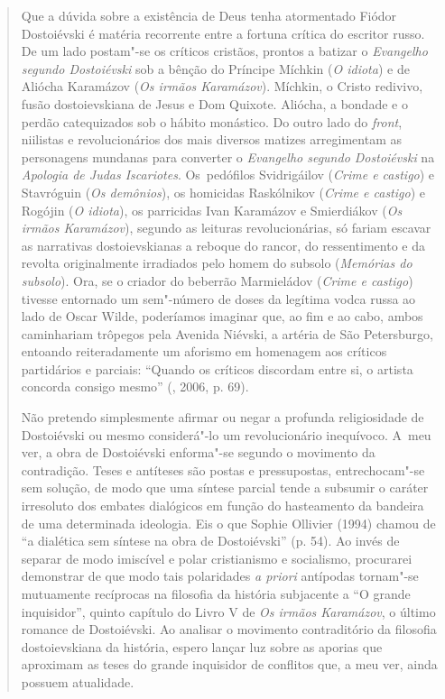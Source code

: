 {\begin{quote}
Que a dúvida sobre a existência de Deus tenha atormentado Fiódor
Dostoiévski é matéria recorrente entre a fortuna crítica do escritor
russo. De um lado postam"-se os críticos cristãos, prontos a batizar o
\emph{Evangelho segundo Dostoiévski} sob a bênção do Príncipe Míchkin
(\emph{O idiota}) e de Aliócha Karamázov (\emph{Os irmãos Karamázov}).
Míchkin, o Cristo redivivo, fusão dostoievskiana de Jesus e Dom Quixote.
Aliócha, a bondade e o perdão catequizados sob o hábito monástico. Do
outro lado do \emph{front}, niilistas e revolucionários dos mais
diversos matizes arregimentam as personagens mundanas para converter o
\emph{Evangelho segundo Dostoiévski} na \emph{Apologia de Judas
Iscariotes}. Os~pedófilos Svidrigáilov (\emph{Crime e castigo}) e
Stavróguin (\emph{Os demônios}), os homicidas Raskólnikov (\emph{Crime e
castigo}) e Rogójin (\emph{O idiota}), os parricidas Ivan Karamázov e
Smierdiákov (\emph{Os irmãos Karamázov}), segundo as leituras
revolucionárias, só fariam escavar as narrativas dostoievskianas a
reboque do rancor, do ressentimento e da revolta originalmente
irradiados pelo homem do subsolo (\emph{Memórias do subsolo}). Ora, se o
criador do beberrão Marmieládov (\emph{Crime e castigo}) tivesse
entornado um sem"-número de doses da legítima vodca russa ao lado de
Oscar Wilde, poderíamos imaginar que, ao fim e ao cabo, ambos
caminhariam trôpegos pela Avenida Niévski, a artéria de São Petersburgo,
entoando reiteradamente um aforismo em homenagem aos críticos
partidários e parciais: ``Quando os críticos discordam entre si, o
artista concorda consigo mesmo'' (, 2006, p. 69).

Não pretendo simplesmente afirmar ou negar a profunda religiosidade de
Dostoiévski ou mesmo considerá"-lo um revolucionário inequívoco. A~meu
ver, a obra de Dostoiévski enforma"-se segundo o movimento da
contradição. Teses e antíteses são postas e pressupostas, entrechocam"-se
sem solução, de modo que uma síntese parcial tende a subsumir o caráter
irresoluto dos embates dialógicos em função do hasteamento da bandeira
de uma determinada ideologia. Eis o que Sophie Ollivier (1994) chamou de
``a dialética sem síntese na obra de Dostoiévski'' (p. 54). Ao invés de
separar de modo imiscível e polar cristianismo e socialismo, procurarei
demonstrar de que modo tais polaridades \emph{a priori} antípodas
tornam"-se mutuamente recíprocas na filosofia da história subjacente a
``O grande inquisidor'', quinto capítulo do Livro V de \emph{Os irmãos
Karamázov}, o último romance de Dostoiévski. Ao analisar o movimento
contraditório da filosofia dostoievskiana da história, espero lançar luz
sobre as aporias que aproximam as teses do grande inquisidor de
conflitos que, a meu ver, ainda possuem atualidade.


\end{quote}}
